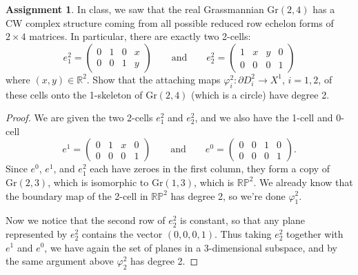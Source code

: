\documentclass[12pt]{article}
\theoremstyle{definition}
\newtheorem{ex}{Assignment}
\begin{document}
\begin{ex}
	In class, we saw that the real Grassmannian $\mathrm{Gr}(2, 4)$ has a CW complex structure coming from all possible reduced row echelon forms of $2 \times 4$ matrices.
	In particular, there are exactly two 2-cells: \begin{equation*}
		e^2_1 = \begin{pmatrix}0 & 1 & 0 & x \\ 0 & 0 & 1 & y\end{pmatrix} \hspace{2em} \text{and} \hspace{2em} e^2_2 = \begin{pmatrix}1 & x & y & 0 \\ 0 & 0 & 0 & 1 \end{pmatrix}
	\end{equation*}
	where $(x, y) \in \mathbb{R}^2$.
	Show that the attaching maps $\varphi^2_i : \partial D^2_i \to X^1$, $i = 1, 2$, of these cells onto the 1-skeleton of $\mathrm{Gr}(2, 4)$ (which is a circle) have degree 2.
\end{ex}
\begin{proof}
  We are given the two 2-cells $e^2_1$ and $e^2_2$, and we also have the 1-cell and 0-cell \begin{equation*}
    e^1 = \begin{pmatrix}0 & 1 & x & 0 \\ 0 & 0 & 0 & 1\end{pmatrix} \hspace{2em} \text{and} \hspace{2em} e^0 = \begin{pmatrix} 0 & 0 & 1 & 0 \\ 0 & 0 & 0 & 1 \end{pmatrix}.
  \end{equation*}
  Since $e^0$, $e^1$, and $e^2_1$ each have zeroes in the first column, they form a copy of $\mathrm{Gr}(2, 3)$, which is isomorphic to $\mathrm{Gr}(1, 3)$, which is $\mathbb{RP}^2$.
  We already know that the boundary map of the 2-cell in $\mathbb{RP}^2$ has degree 2, so we're done $\varphi^2_1$.

  Now we notice that the second row of $e^2_2$ is constant, so that any plane represented by $e^2_2$ contains the vector $(0, 0, 0, 1)$.
  Thus taking $e^2_2$ together with $e^1$ and $e^0$, we have again the set of planes in a 3-dimensional subspace, and by the same argument above $\varphi^2_2$ has degree 2.
\end{proof}
\end{document}
